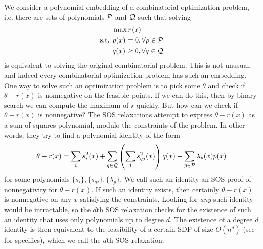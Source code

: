 We consider a polynomial embedding of a combinatorial optimization problem, i.e. there are sets of polynomials $\mathcal P$ and $\mathcal Q$ such that solving
\begin{align*}
&\max r(x) \\
\text{s.t. } &p(x) = 0, \forall p \in \mathcal P \\
&q(x) \geq 0, \forall q \in \mathcal Q
\end{align*}
is equivalent to solving the original combinatorial problem. This is not unusual, and indeed every combinatorial optimization problem has such an embedding. One way to solve such an optimization problem is to pick some $\theta$ and check if $\theta - r(x)$ is nonnegative on the feasible points. If we can do this, then by binary search we can compute the maximum of $r$ quickly. But how can we check if $\theta - r(x)$ is nonnegative? The SOS relaxations attempt to express $\theta - r(x)$ as a sum-of-squares polynomial, modulo the constraints of the problem. In other words, they try to find a polynomial identity of the form
\[\theta - r(x) = \sum_i s_i^2(x) + \sum_{q \in \mathcal Q} \left(\sum_j s_{qj}^2(x)\right)q(x) + \sum_{p\in\mathcal P} \lambda_p(x)p(x)\label{eq:intro_sos_proof}\]
for some polynomials $\{s_i\}, \{s_{qj}\}, \{\lambda_p\}$. 
We call such an identity an SOS proof of nonnegativity for $\theta - r(x)$.
If such an identity exists, then certainly $\theta - r(x)$ is nonnegative on any $x$ satisfying the constraints. Looking for \emph{any} such identity would be intractable, so the $d$th SOS relaxation checks for the existence of such an identity that uses only polynomials up to degree $d$. The existence of a degree $d$ identity is then equivalent to the feasibility of a certain SDP of size $O(n^d)$ (see  for specifics), which we call the $d$th SOS relaxation.

